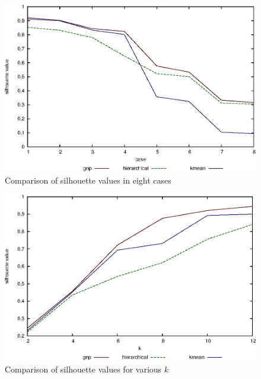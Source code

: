 \documentclass{elsart}
\begin{document}
\begin{figure}
\begin{center}
\includegraphics[width=12cm]{images/silhouette}
\caption{\label{silhouette} Comparison of silhouette values in eight cases}
\end{center}
\end{figure}

\begin{figure}
\begin{center}
\includegraphics[width=12cm]{images/silhouette-k}
\caption{\label{silhouette-k} Comparison of silhouette values for various $k$}
\end{center}
\end{figure}
\end{document}
